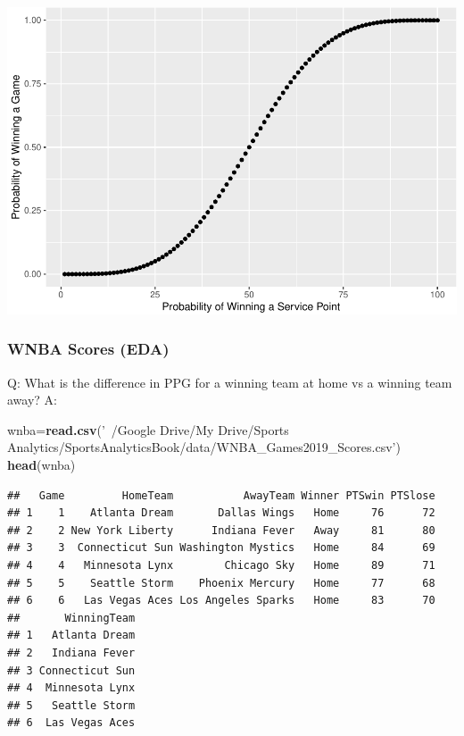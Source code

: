 \documentclass[]{article}
\newenvironment{Shaded}{\begin{snugshade}}{\end{snugshade}}
\newcommand{\KeywordTok}[1]{\textcolor[rgb]{0.13,0.29,0.53}{\textbf{#1}}}
\newcommand{\NormalTok}[1]{#1}
\newcommand{\StringTok}[1]{\textcolor[rgb]{0.31,0.60,0.02}{#1}}
\begin{document}
\includegraphics{22-isaac_files/figure-latex/unnamed-chunk-6-1.pdf}

\hypertarget{wnba-scores-eda}{%
\subsubsection{WNBA Scores (EDA)}\label{wnba-scores-eda}}

Q: What is the difference in PPG for a winning team at home vs a winning
team away? A:

\begin{Shaded}
\begin{Highlighting}[]
\NormalTok{wnba=}\KeywordTok{read.csv}\NormalTok{(}\StringTok{'~/Google Drive/My Drive/Sports Analytics/SportsAnalyticsBook/data/WNBA_Games2019_Scores.csv'}\NormalTok{)}
\KeywordTok{head}\NormalTok{(wnba)}
\end{Highlighting}
\end{Shaded}

\begin{verbatim}
##   Game         HomeTeam           AwayTeam Winner PTSwin PTSlose
## 1    1    Atlanta Dream       Dallas Wings   Home     76      72
## 2    2 New York Liberty      Indiana Fever   Away     81      80
## 3    3  Connecticut Sun Washington Mystics   Home     84      69
## 4    4   Minnesota Lynx        Chicago Sky   Home     89      71
## 5    5    Seattle Storm    Phoenix Mercury   Home     77      68
## 6    6   Las Vegas Aces Los Angeles Sparks   Home     83      70
##       WinningTeam
## 1   Atlanta Dream
## 2   Indiana Fever
## 3 Connecticut Sun
## 4  Minnesota Lynx
## 5   Seattle Storm
## 6  Las Vegas Aces
\end{verbatim}
\end{document}
